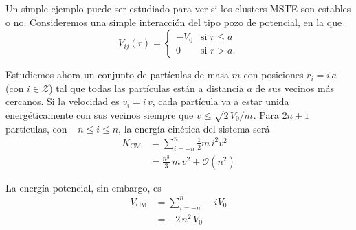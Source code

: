 Un simple ejemplo puede ser estudiado para ver si los clusters MSTE son estables o no.
Consideremos una simple interacción del tipo pozo de potencial, en la que
\begin{equation}
V_{ij}(r) =
\begin{cases}
-V_0 &\text{si } r \leq a\\
0 &\text{si } r > a.
\end{cases}
\end{equation}

Estudiemos ahora un conjunto de partículas de masa $m$ con posiciones $r_i = i\,a$ (con $i \in \mathcal{Z}$) tal que todas las partículas están a distancia $a$ de sus vecinos más cercanos.
Si la velocidad es $v_i = i\,v$, cada partícula va a estar unida energéticamente con sus vecinos siempre que $v \leq \sqrt{2\,V_0/m}$.
Para $2n+1$ partículas, con $-n \leq i \leq n$, la energía cinética del sistema será
\begin{align}
  K_{\text{CM}} &= \sum_{i=-n}^n \frac{1}{2} m\, i^2 v^2\\
  &= \frac{n^3}{3}\,m\,v^2 + \mathcal{O}(n^2)
\end{align}

La energía potencial, sin embargo, es
\begin{align}
  V_{\text{CM}} &= \sum_{i=-n}^n -i V_0\\
  &= - 2\,n^2\,V_0
\end{align}
